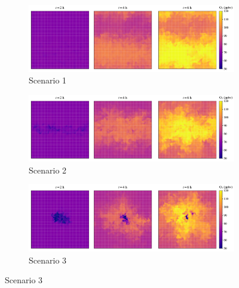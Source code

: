 \begin{figure}[h]
  \centering
  \begin{subfigure}
    \centering
    \includegraphics[width=\textwidth]{figures/o3-crosssec-fx1fy0-z25.pdf}
    \caption{Scenario 1}
  \end{subfigure}
     \vspace*{5mm} 
  \begin{subfigure}
    \centering
    \includegraphics[width=\textwidth]{figures/o3-crosssec-road-10x-z25.pdf}
    \caption{Scenario 2}
  \end{subfigure}
   \vspace*{5mm} 
  \begin{subfigure}
    \centering
    \includegraphics[width=\textwidth]{figures/o3-crosssec-point-source-1x1-z25.pdf}
    \caption{Scenario 3}
  \end{subfigure}
\end{figure}

